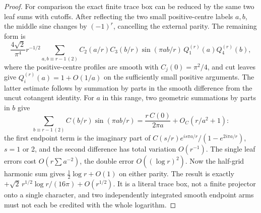 \begin{proof}
For comparison the exact finite trace box can be
reduced by the same two leaf sums with cutoffs.
After reflecting the two small positive-centre
labels \(a,b\), the middle sine changes by
\((-1)^r\), cancelling the external parity.
The remaining form is
\[
 \frac{4\sqrt2}{\pi^4}r^{-1/2}
 \sum_{a,b\equiv r-1\, (2)} C_2(a/r)C_3(b/r)
   \sin(\pi ab/r)\,Q_1^{(r)}(a)Q_4^{(r)}(b),
\]
where the positive-centre profiles are smooth with
\(C_j(0)=\pi^2/4\), and cut leaves give
\(Q_i^{(r)}(a)=1+O(1/a)\) on the sufficiently small
positive arguments. The latter estimate follows by
summation by parts in the smooth difference from
the uncut cotangent identity. For \(a\) in this range,
two geometric summations by parts in \(b\) give
\[
 \sum_{b\equiv r-1\, (2)} C(b/r)\sin(\pi ab/r)
    =\frac{r\,C(0)}{2\pi a}+O_C(r/a^2+1):
\]
the first endpoint term is the imaginary part of
\(C(s/r)e^{is\pi a/r}/(1-e^{2i\pi a/r})\),
\(s=1\) or 2, and the second difference has total
variation \(O(r^{-1})\). The single leaf errors cost
\(O(r\sum a^{-2})\), the double error \(O((\log r)^2)\).
Now the half-grid harmonic sum gives \(\frac12\log r+O(1)\)
on either parity. The result is exactly
\(+\sqrt2\,r^{1/2}\log r/(16\pi)+O(r^{1/2})\).
It is a literal trace box, not a finite projector onto
a single character, and two independently integrated
smooth endpoint arms must not each be credited with
the whole logarithm.
\end{proof}
